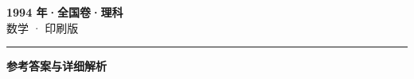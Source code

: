 \documentclass[zihao=5, a4paper]{ctexart}
\begin{document}
\begin{center}
  {\Large\bfseries 1994 年·全国卷·理科}\\[4pt]
  {\large 数学 · 印刷版}
\end{center}
\medskip
{}

\par\bigskip\hrule\bigskip
{}
\begin{center}{\large\bfseries 参考答案与详细解析}\end{center}
\smallskip

\end{document}
